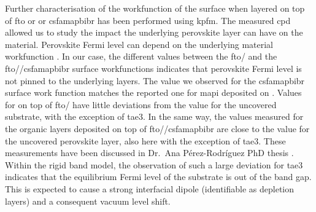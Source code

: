 	Further characterisation of the workfunction of the  surface when layered on top of \gls{fto} or  or \gls{csfamapbibr} has been performed using \gls{kpfm}.
	The measured \gls{cpd} allowed us to study the impact the underlying perovskite layer can have on the  material.
	Perovskite Fermi level can depend on the underlying material workfunction \cite{Miller2014,Olthof2017}.
	In our case, the different values between the \gls{fto}\-/ and the \gls{fto}\-/\-/\gls{csfamapbibr} surface workfunctions indicates that perovskite Fermi level is not pinned to the underlying layers.
	The value we observed for the \gls{csfamapbibr} surface work function matches the reported one for \gls{mapi} deposited on  \cite{Miller2014}.
	Values for  on top of \gls{fto}\-/ have little deviations from the value for the uncovered substrate, with the exception of \gls{tae3}.
	In the same way, the values measured for the organic layers deposited on top of \gls{fto}\-/\-/\gls{csfamapbibr} are close to the value for the uncovered perovskite layer, also here with the exception of \gls{tae3}.
	These measurements have been discussed in Dr.\ Ana Pérez\hyp{}Rodríguez PhD thesis \cite{Perez-Rodriguez2018}.
	Within the rigid band model, the observation of such a large deviation for \gls{tae3} indicates that the equilibrium Fermi level of the substrate is out of the  band gap.
	This is expected to cause a strong interfacial dipole (identifiable as depletion layers) and a consequent vacuum level shift.

	
